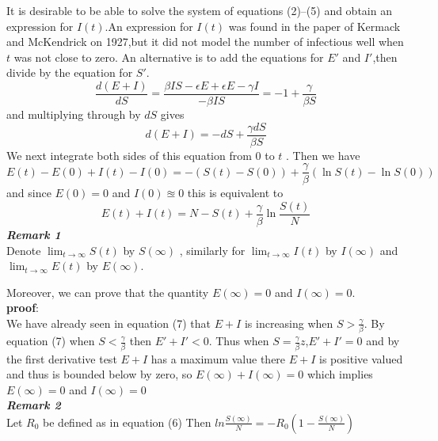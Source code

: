 \documentclass{exam}
\begin{document}
\begin{itemize}
It is desirable to be able to solve the system of equations (2)–(5) and obtain an expression for $I(t)$.An expression for $I(t)$ was found in the paper of Kermack and McKendrick on  1927,but it did not model the number of infectious well when $t$ was not close to zero. An alternative is to add the equations for $E'$ and $I'$,then divide by the equation for $S'$.
\begin{equation*}
\frac{d(E+I)}{dS}= \frac{\beta I S - \epsilon E +\epsilon E - \gamma I}{-\beta I S} = -1 +\frac{\gamma}{\beta S}
\end{equation*}
and multiplying through by $dS$ gives
\begin{equation}
d(E+I)= -dS +\frac{\gamma dS}{\beta S}
\end{equation}
We next integrate both sides of this equation from 0 to $t$ . Then we have 
\begin{equation*}
E(t)-E(0) +I(t) -I(0) = -(S(t)-S(0)) +\frac{\gamma}{\beta}(\ln S(t) -\ln S(0))
\end{equation*}
and since $E(0)= 0 $ and $I(0) \approxeq 0$ this is equivalent to 
\begin{equation}
E(t) +I(t) = N-S(t) +\frac{\gamma}{\beta}\ln \frac{S(t)}{N}
\end{equation}
 \textit{\textbf{Remark 1}}\\
Denote $\lim_{t \rightarrow \infty} S(t) $ by $S(\infty)$ , similarly for $\lim_{t \rightarrow \infty} I(t) $ by $I(\infty)$ and $\lim_{t \rightarrow \infty} E(t) $ by $E(\infty)$.

Moreover, we can prove that the quantity $E(\infty) = 0$ and $I(\infty) = 0$.\\
\textbf{proof}:\\
 We have already seen in equation (7) that $E+ I$ is increasing when $S > \frac{\gamma}{\beta}$. By equation (7) when $S < \frac{\gamma}{\beta} $ then $E' + I' <0$. Thus when $S= \frac{\gamma}{\beta}z $,$ E' + I' = 0$ and by the first derivative test $E+ I$ has a maximum value there  $E+ I$ is positive valued and thus is bounded below by zero, so $E(\infty) + I(\infty) = 0$ which implies $E(\infty) =0$ and  $ I(\infty) =0$\\
 
 \textit{\textbf{Remark 2}}\\
 Let $R_0$ be defined as in equation (6) Then $ln \frac{S(\infty)}{N}= -R_0 (1-\frac{S(\infty)}{N})$\\
 

\end{itemize}
\end{document}
